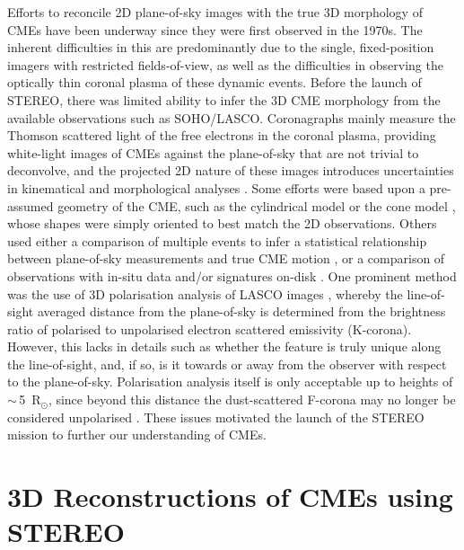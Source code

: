 \documentclass[preprint2]{aastex}
\begin{document}
Efforts to reconcile 2D plane-of-sky images with the true 3D morphology of CMEs have been underway since they were first observed in the 1970s. The inherent difficulties in this are predominantly due to the single, fixed-position imagers with restricted fields-of-view, as well as the difficulties in observing the optically thin coronal plasma of these dynamic events. Before the launch of STEREO, there was limited ability to infer the 3D CME morphology from the available observations such as SOHO/LASCO. Coronagraphs mainly measure the Thomson scattered light of the free electrons in the coronal plasma, providing white-light images of CMEs against the plane-of-sky that are not trivial to deconvolve,  and the projected 2D nature of these images introduces uncertainties in kinematical and morphological analyses \citep{2007A&A...469..339V}. Some efforts were based upon a pre-assumed geometry of the CME, such as the cylindrical model \citep{2004A&A...422..307C} or the cone model \citep{2005JGRA..11008103X, 2002JGRA..107.1223Z}, whose shapes were simply oriented to best match the 2D observations. Others used either a comparison of multiple events to infer a statistical relationship between plane-of-sky measurements and true CME motion \citep{2005AnGeo..23.1033S, 2005A&A...440..373H}, or a comparison of observations with in-situ data and/or signatures on-disk \citep{2008SoPh..250..347D, 2008JGRA..11301104H}. One prominent method was the use of 3D polarisation analysis of LASCO images \citep{2004Sci...305...66M}, whereby the line-of-sight averaged distance from the plane-of-sky is determined from the brightness ratio of polarised to unpolarised electron scattered emissivity (K-corona). However, this lacks in details such as whether the feature is truly unique along the line-of-sight, and, if so, is it towards or away from the observer with respect to the plane-of-sky. Polarisation analysis itself is only acceptable up to heights of $\sim$\,5~R$_{\odot}$, since beyond this distance the dust-scattered F-corona may no longer be considered unpolarised \citep{1966gtsc.book.....B}. These issues motivated the launch of the STEREO mission to further our understanding of CMEs.


\section{3D Reconstructions of CMEs using STEREO}
\end{document}
